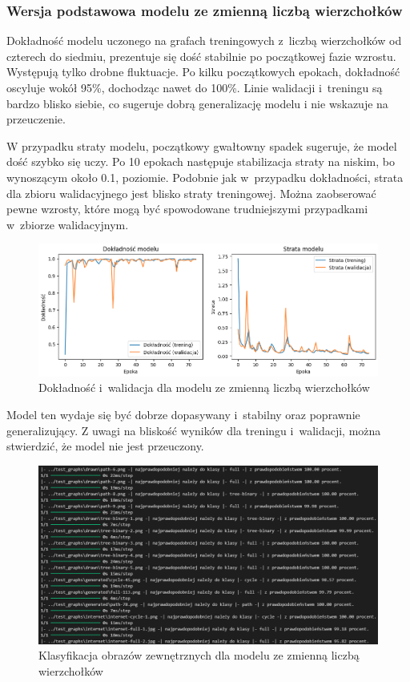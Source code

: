 \subsubsection{Wersja podstawowa modelu ze zmienną liczbą wierzchołków}

Dokładność modelu uczonego na grafach treningowych z~liczbą wierzchołków od czterech do siedmiu,
prezentuje się dość stabilnie po początkowej fazie wzrostu. Występują tylko drobne fluktuacje.
Po kilku początkowych epokach, dokładność oscyluje wokół 95\%, dochodząc nawet do 100\%.
Linie walidacji i~treningu są bardzo blisko siebie, co sugeruje dobrą generalizację modelu
i nie wskazuje na przeuczenie.

W przypadku straty modelu, początkowy gwałtowny spadek sugeruje, że model dość szybko się uczy.
Po 10 epokach następuje stabilizacja straty na niskim, bo wynoszącym około 0.1, poziomie.
Podobnie jak w~przypadku dokładności, strata dla zbioru walidacyjnego jest blisko straty treningowej.
Można zaobserować pewne wzrosty, które mogą być spowodowane trudniejszymi przypadkami w~zbiorze walidacyjnym.

\begin{figure}[ht]
	\centering
	\includegraphics[width=15.5cm]{resources/tests/images/v3/multiple_edges_img.png}
	\caption{Dokładność i~walidacja dla modelu ze zmienną liczbą wierzchołków}
	\label{Fig:tests-var-0a}
\end{figure}
\FloatBarrier

Model ten wydaje się być dobrze dopasywany i~stabilny oraz poprawnie generalizujący.
Z uwagi na bliskość wyników dla treningu i~walidacji, można stwierdzić, że model nie jest przeuczony.

\begin{figure}[ht]
	\centering
	\includegraphics[width=15.5cm]{resources/tests/images/v3/multiple_edges_txt.png}
	\caption{Klasyfikacja obrazów zewnętrznych dla modelu ze zmienną liczbą wierzchołków}
	\label{Fig:tests-var-0b}
\end{figure}
\FloatBarrier

